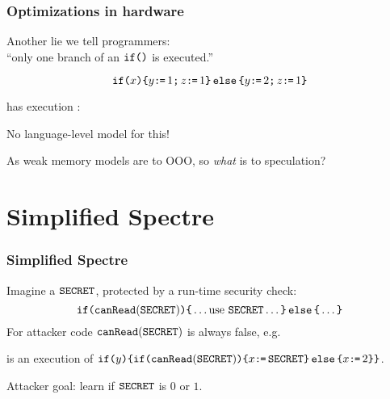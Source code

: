 \documentclass[aspectratio=169]{beamer}
\begin{document}
\begin{frame}
  \frametitle{Optimizations in hardware}

  Another lie we tell programmers:\\
  ``only one branch of an $\IF{}$ is executed.''

  \[ \IF{\aLoc}\THEN \bLoc\GETS1\SEMI\cLoc\GETS1 \ELSE \bLoc\GETS2\SEMI\cLoc\GETS1 \FI \]

  has execution%
  :
 
\begin{tikzdisplay}[node distance=1em]
\end{tikzdisplay}

  \pause\pause\pause\pause
  No language-level model for this!

  \medskip
  As weak memory models are to OOO, so \emph{what} is to speculation?

\end{frame}

\section{Simplified Spectre}
\begin{frame}
  \frametitle{Simplified Spectre}

  Imagine a $\SEC$, protected by a run-time security check:
  \[
     \IF{\CANREAD(\SEC)} \THEN \dots\mbox{use } \SEC\dots \ELSE \dots \FI
  \]
  For attacker code $\CANREAD(\SEC)$ is always false\pause, e.g.
\begin{tikzdisplay}[node distance=1em]
\end{tikzdisplay}
  is an execution of
  \(
     \IF{y} \THEN \IF{\CANREAD(\SEC)} \THEN x\GETS\SEC \ELSE x\GETS2 \FI \FI
  \).

  \pause\bigskip
  Attacker goal: learn if $\SEC$ is $0$ or $1$.
  
\end{frame}
\end{document}
